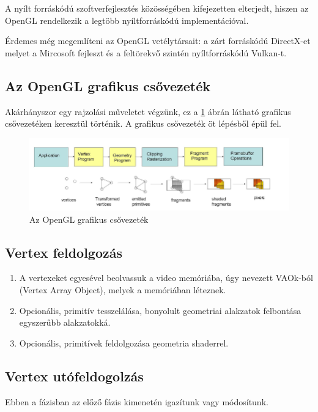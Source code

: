 A nyílt forráskódú szoftverfejlesztés közösségében kifejezetten elterjedt, hiszen az OpenGL rendelkezik a legtöbb nyíltforráskódú implementációval.

Érdemes még megemlíteni az OpenGL vetélytársait: a zárt forráskódú DirectX-et melyet a Mircosoft fejleszt és a feltörekvő szintén nyíltforráskódú Vulkan-t.

\newpage

\subsection{Az OpenGL grafikus csővezeték}
Akárhányszor egy rajzolási műveletet végzünk, ez a \ref{fig:graphics_pipeline} ábrán látható grafikus csővezetéken  keresztül történik. A grafikus csővezeték öt lépésből épül fel.

\begin{figure}[h]
    \centering
    \includegraphics[width=\textwidth,height=\textheight,keepaspectratio]
    {resources/graphics_pipeline.png}
    \caption{Az OpenGL grafikus csővezeték\cite{OpenGLGraphicsPipeline}}
    \label{fig:graphics_pipeline}
\end{figure}

\subsection*{Vertex feldolgozás}
\begin{enumerate}
    \item A vertexeket egyesével beolvassuk a video memóriába, úgy nevezett VAOk-ból (Vertex Array Object), melyek a memóriában léteznek.
    \item Opcionális, primitív tesszelálása, bonyolult geometriai alakzatok felbontása egyszerűbb alakzatokká.
    \item Opcionális, primitívek feldolgozása geometria shaderrel.
\end{enumerate}

\subsection*{Vertex utófeldogolzás}
Ebben a fázisban az előző fázis kimenetén igazítunk vagy módosítunk.

